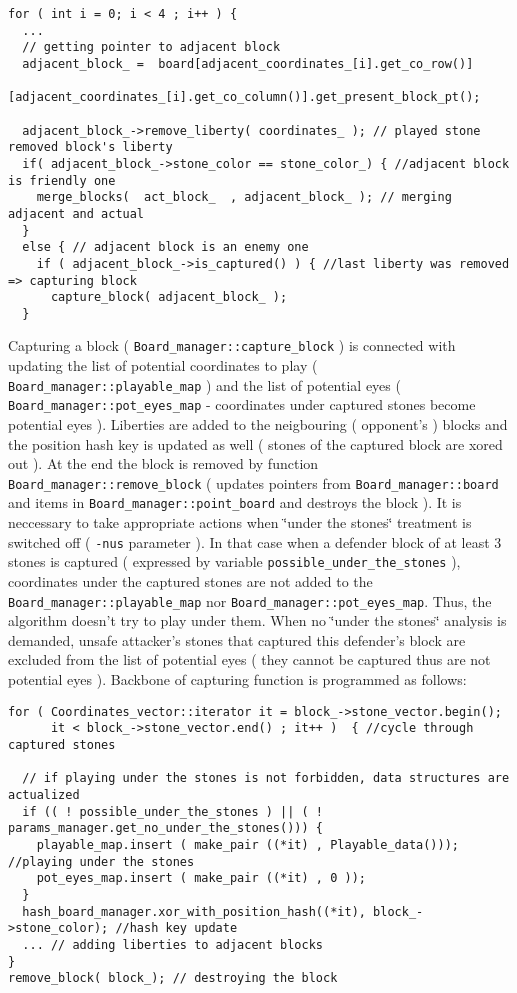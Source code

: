 \footnotesize\begin{verbatim}for ( int i = 0; i < 4 ; i++ ) {
  ...
  // getting pointer to adjacent block 
  adjacent_block_ =  board[adjacent_coordinates_[i].get_co_row()]
                      [adjacent_coordinates_[i].get_co_column()].get_present_block_pt(); 

  adjacent_block_->remove_liberty( coordinates_ ); // played stone removed block's liberty
  if( adjacent_block_->stone_color == stone_color_) { //adjacent block is friendly one
    merge_blocks(  act_block_  , adjacent_block_ ); // merging adjacent and actual 
  }
  else { // adjacent block is an enemy one 
    if ( adjacent_block_->is_captured() ) { //last liberty was removed => capturing block
      capture_block( adjacent_block_ );
  }
\end{verbatim}
\normalsize


Capturing a block ( {\tt Board\_\-manager::capture\_\-block} ) is connected with updating the list of potential coordinates to play ( {\tt Board\_\-manager::playable\_\-map} ) and the list of potential eyes ( {\tt Board\_\-manager::pot\_\-eyes\_\-map} - coordinates under captured stones become potential eyes ). Liberties are added to the neigbouring ( opponent's ) blocks and the position hash key is updated as well ( stones of the captured block are xored out ). At the end the block is removed by function {\tt Board\_\-manager::remove\_\-block} ( updates pointers from {\tt Board\_\-manager::board} and items in {\tt Board\_\-manager::point\_\-board} and destroys the block ). It is neccessary to take appropriate actions when \char`\"{}under the stones\char`\"{} treatment is switched off ( {\tt -nus} parameter ). In that case when a defender block of at least 3 stones is captured ( expressed by variable {\tt possible\_\-under\_\-the\_\-stones} ), coordinates under the captured stones are not added to the {\tt Board\_\-manager::playable\_\-map} nor {\tt Board\_\-manager::pot\_\-eyes\_\-map}. Thus, the algorithm doesn't try to play under them. When no \char`\"{}under the stones\char`\"{} analysis is demanded, unsafe attacker's stones that captured this defender's block are excluded from the list of potential eyes ( they cannot be captured thus are not potential eyes ). Backbone of capturing function is programmed as follows:



\footnotesize\begin{verbatim}for ( Coordinates_vector::iterator it = block_->stone_vector.begin(); 
      it < block_->stone_vector.end() ; it++ )  { //cycle through captured stones

  // if playing under the stones is not forbidden, data structures are actualized
  if (( ! possible_under_the_stones ) || ( ! params_manager.get_no_under_the_stones())) {
    playable_map.insert ( make_pair ((*it) , Playable_data())); //playing under the stones
    pot_eyes_map.insert ( make_pair ((*it) , 0 ));  
  }
  hash_board_manager.xor_with_position_hash((*it), block_->stone_color); //hash key update
  ... // adding liberties to adjacent blocks 
}
remove_block( block_); // destroying the block
\end{verbatim}
\normalsize


